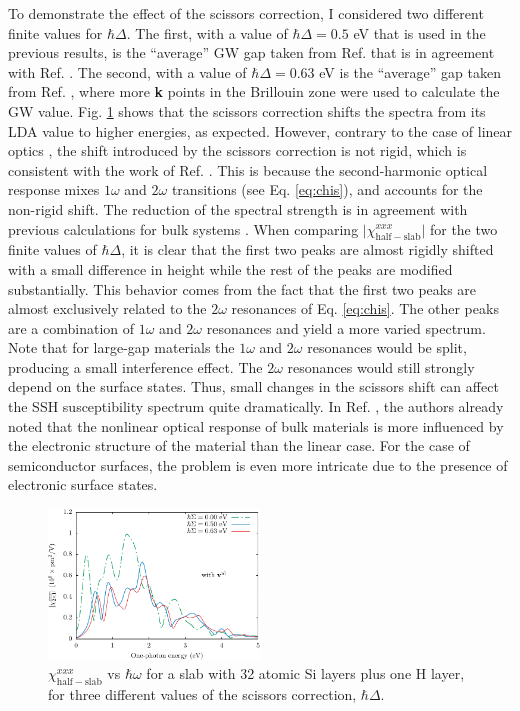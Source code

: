 To demonstrate the effect of the scissors correction, I considered two different
finite values for $\hbar\Delta$. The first, with a value of $\hbar\Delta=0.5$ eV
that is used in the previous results, is the ``average'' GW gap taken from Ref.
\cite{rohlfingPRB95} that is in agreement with Ref. \cite{garciaCPC01}. The
second, with a value of $\hbar\Delta=0.63$ eV is the ``average'' gap taken from
Ref. \cite{asahiPRB00}, where more \textbf{k} points in the Brillouin zone were
used to calculate the GW value. Fig. \ref{fig:scissors} shows that the scissors
correction shifts the spectra from its LDA value to higher energies, as
expected. However, contrary to the case of linear optics \cite{cabellosPRB09},
the shift introduced by the scissors correction is not rigid, which is
consistent with the work of Ref. \cite{nastosPRB05}. This is because the
second-harmonic optical response mixes $1\omega$ and $2\omega$ transitions (see
Eq. \eqref{eq:chis}), and accounts for the non-rigid shift. The reduction of the
spectral strength is in agreement with previous calculations for bulk systems
\cite{nastosPRB05, luppiPRB10, leitsmannPRB05}. When comparing
$\vert\chi^{xxx}_{\mathrm{half-slab}}\vert$ for the two finite values of
$\hbar\Delta$, it is clear that the first two peaks are almost rigidly shifted
with a small difference in height while the rest of the peaks are modified
substantially. This behavior comes from the fact that the first two peaks are
almost exclusively related to the $2\omega$ resonances of Eq.
\eqref{eq:chis}. The other peaks are a combination of $1\omega$ and $2\omega$
resonances and yield a more varied spectrum. Note that for large-gap materials
the $1\omega$ and $2\omega$ resonances would be split, producing a small
interference effect. The $2\omega$ resonances would still strongly depend on the
surface states. Thus, small changes in the scissors shift can affect the SSH
susceptibility spectrum quite dramatically. In Ref. \cite{adolphPRB00}, the
authors already noted that the nonlinear optical response of bulk materials is
more influenced by the electronic structure of the material than the linear
case. For the case of semiconductor surfaces, the problem is even more intricate
due to the presence of electronic surface states.

\begin{figure}[H]
\centering 
\includegraphics[width=0.5\textwidth]{content/figures/fig-Si2x1-scissors}
\caption{$\chi^{xxx}_{\mathrm{half-slab}}$ vs $\hbar\omega$ for a slab with 32
atomic Si layers plus one H layer, for three different values of the scissors
correction, $\hbar\Delta$.
\label{fig:scissors}} 
\end{figure}

